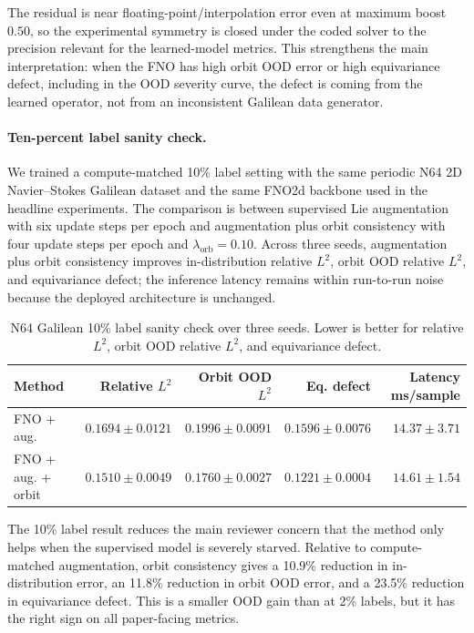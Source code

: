 The residual is near floating-point/interpolation error even at maximum boost \(0.50\), so the experimental symmetry is closed under the coded solver to the precision relevant for the learned-model metrics. This strengthens the main interpretation: when the FNO has high orbit OOD error or high equivariance defect, including in the OOD severity curve, the defect is coming from the learned operator, not from an inconsistent Galilean data generator.

\paragraph{Ten-percent label sanity check.} We trained a compute-matched 10\% label setting with the same periodic N64 2D Navier--Stokes Galilean dataset and the same FNO2d backbone used in the headline experiments. The comparison is between supervised Lie augmentation with six update steps per epoch and augmentation plus orbit consistency with four update steps per epoch and \(\lambda_{\mathrm{orb}}=0.10\). Across three seeds, augmentation plus orbit consistency improves in-distribution relative \(L^2\), orbit OOD relative \(L^2\), and equivariance defect; the inference latency remains within run-to-run noise because the deployed architecture is unchanged.

\begin{table}[t]
\centering
\small
\caption{N64 Galilean 10\% label sanity check over three seeds. Lower is better for relative \(L^2\), orbit OOD relative \(L^2\), and equivariance defect.}
\label{tab:new-n64-10pct}
\begin{tabular}{lrrrr}
\toprule
Method & Relative \(L^2\) & Orbit OOD \(L^2\) & Eq. defect & Latency ms/sample \\
\midrule
FNO + aug. & \(0.1694\pm0.0121\) & \(0.1996\pm0.0091\) & \(0.1596\pm0.0076\) & \(14.37\pm3.71\) \\
FNO + aug. + orbit & \(\mathbf{0.1510\pm0.0049}\) & \(\mathbf{0.1760\pm0.0027}\) & \(\mathbf{0.1221\pm0.0004}\) & \(14.61\pm1.54\) \\
\bottomrule
\end{tabular}
\end{table}

The 10\% label result reduces the main reviewer concern that the method only helps when the supervised model is severely starved. Relative to compute-matched augmentation, orbit consistency gives a 10.9\% reduction in in-distribution error, an 11.8\% reduction in orbit OOD error, and a 23.5\% reduction in equivariance defect. This is a smaller OOD gain than at 2\% labels, but it has the right sign on all paper-facing metrics.

